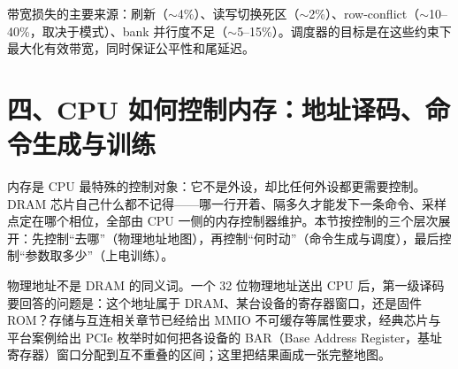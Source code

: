 带宽损失的主要来源：刷新（$\sim$4\%）、读写切换死区（$\sim$2\%）、row-conflict（$\sim$10--40\%，取决于模式）、bank 并行度不足（$\sim$5--15\%）。调度器的目标是在这些约束下最大化有效带宽，同时保证公平性和尾延迟。

\section{四、CPU 如何控制内存：地址译码、命令生成与训练}

内存是 CPU 最特殊的控制对象：它不是外设，却比任何外设都更需要控制。DRAM 芯片自己什么都不记得——哪一行开着、隔多久才能发下一条命令、采样点定在哪个相位，全部由 CPU 一侧的内存控制器维护。本节按控制的三个层次展开：先控制“去哪”（物理地址地图），再控制“何时动”（命令生成与调度），最后控制“参数取多少”（上电训练）。


物理地址不是 DRAM 的同义词。一个 32 位物理地址送出 CPU 后，第一级译码要回答的问题是：这个地址属于 DRAM、某台设备的寄存器窗口，还是固件 ROM？存储与互连相关章节已经给出 MMIO 不可缓存等属性要求，经典芯片与平台案例给出 PCIe 枚举时如何把各设备的 BAR（Base Address Register，基址寄存器）窗口分配到互不重叠的区间；这里把结果画成一张完整地图。

